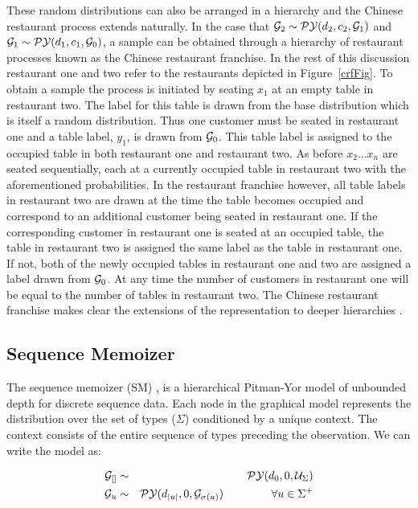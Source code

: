 These random distributions can also be arranged in a hierarchy and the Chinese restaurant process extends naturally.  In the case that $\G_2 \sim \PY(d_2, c_2, \G_1)$ and $\G_1 \sim \PY(d_1, c_1, \G_0)$, a sample can be obtained through a hierarchy of restaurant processes known as the Chinese restaurant franchise.  In the rest of this discussion restaurant one and two refer to the restaurants depicted in Figure~\ref{crfFig}. To obtain a sample the process is initiated by seating $x_1$ at an empty table in restaurant two.  The label for this table is drawn from the base distribution which is itself a random distribution.  Thus one customer must be seated in restaurant one and a table label, $y_1$, is drawn from $\G_0$.  This table label is assigned to the occupied table in both restaurant one and restaurant two.  As before $x_2 \ldots x_n$ are seated sequentially, each at a currently occupied table in restaurant two with the aforementioned probabilities.  In the restaurant franchise however, all table labels in restaurant two are drawn at the time the table becomes occupied and correspond to an additional customer being seated in restaurant one.  If the corresponding customer in restaurant one is seated at an occupied table, the table in restaurant two is assigned the same label as the table in restaurant one.  If not, both of the newly occupied tables in restaurant one and two are assigned a label drawn from $\G_0$.  At any time the number of customers in restaurant one will be equal to the number of tables in restaurant two.  The Chinese restaurant franchise makes clear the extensions of the representation to deeper hierarchies  \cite{teh et al ?}.

\subsection{Sequence Memoizer}

The sequence memoizer (SM) \cite{wood}, is a hierarchical Pitman-Yor model of unbounded depth for discrete sequence data.  Each node in the graphical model represents the distribution over the set of types ($\Sigma$) conditioned by a unique context.  The context consists of the entire sequence of types preceding the observation.  We can write the model as:

\begin{eqnarray*}
	\G_{[]} &\sim& \PY(d_0, 0, \mathcal{U}_{\Sigma }) \\
	\G_{u} &\sim& \PY(d_{|u|}, 0, \G_{\sigma(u)}) \hspace{1.5cm} \forall u \in \Sigma^+
\end{eqnarray*}

